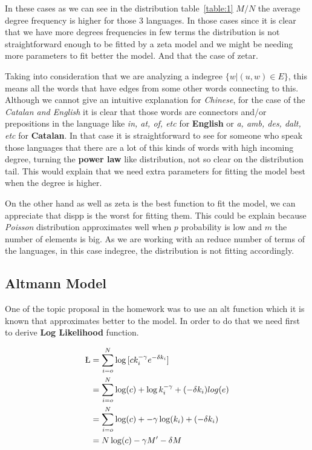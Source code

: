 \documentclass[12pt, a4paper]{article}
\begin{document}
In these cases as we can see in the distribution table~\ref{table:1} $M/N$ the average degree frequency is higher for those $3$ languages. In those cases since it is 
clear that we have more degrees frequencies in few terms the distribution is not straightforward enough to be fitted by a \acrshort{zeta} model and we might be needing more
parameters to fit better the model. And that the case of \acrshort{zetar}.

Taking into consideration that we are analyzing a \acrshort{indegree} $\{w | (u,w) \in E\}$, this means all the words that have edges from some other words connecting to this.
Although we cannot give an intuitive explanation for \textit{Chinese}, for the case of the \textit{Catalan and English} it is clear that those words are connectors and/or 
prepositions in the language like \textit{in, at, of, etc} for \textbf{English} or \textit{a, amb, des, dalt, etc} for \textbf{Catalan}. In that case it is straightforward to 
see for someone who speak those languages that there are a lot of this kinds of words with high incoming degree, turning the \textbf{power law} like distribution, not so clear 
on the distribution tail. This would explain that we need extra parameters for fitting the model best when the degree is higher.

On the other hand as well as \acrshort{zeta} is the best function to fit the model, we can appreciate that \acrshort{dispp} is the worst for fitting them. This could be explain
because \textit{Poisson} distribution approximates well when $p$ probability is low and $m$ the number of elements is big. As we are working with an reduce number of terms of the languages,
in this case \acrshort{indegree}, the distribution is not fitting accordingly. 

\subsection{Altmann Model}
One of the topic proposal in the homework was to use an \acrshort{alt} function which it is known that approximates better to the model.
In order to do that we need first to derive \textbf{Log Likelihood} function.

\begin{subequations}
    \begin{align}
        \L &= \sum_{i=o}^N \log{[ck_i^{-\gamma} e^{-\delta k_i}]}\\
           &= \sum_{i=o}^N \log(c) + \log{k_i^{-\gamma}} + (-\delta k_i) log(e)\\
           &= \sum_{i=o}^N \log(c) + -\gamma \log(k_i) + (-\delta k_i) \\
           &= N\log(c) -\gamma M' -\delta M  \\
    \end{align}
    \end{subequations}
\end{document}
